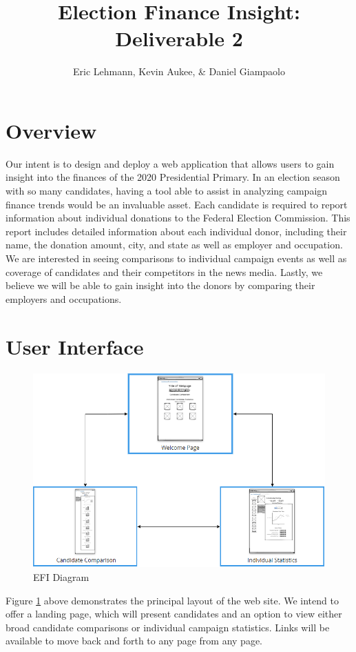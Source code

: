 \documentclass[12pt]{article}
\title{Election Finance Insight:\\Deliverable 2}
\author{Eric Lehmann, Kevin Aukee, \& Daniel Giampaolo}
\begin{document}
\maketitle
\section{Overview}
Our intent is to design and deploy a web application that allows users to gain insight into the finances of the 2020 Presidential Primary. In an election season with so many candidates, having a tool able to assist in analyzing campaign finance trends would be an invaluable asset. Each candidate is required to report information about individual donations to the Federal Election Commission. This report includes detailed information about each individual donor, including their name, the donation amount, city, and state as well as employer and occupation. We are interested in seeing comparisons to individual campaign events as well as coverage of candidates and their competitors in the news media. Lastly, we believe we will be able to gain insight into the donors by comparing their employers and occupations.
\section{User Interface}
    \begin{figure}[H]
        \begin{center}
        \includegraphics[scale=.60]{EFINode}
        \caption{EFI Diagram}
        \label{fig:EFINode}
        \end{center}
    \end{figure}
    Figure \ref{fig:EFINode} above demonstrates the principal layout of the web site. We intend to offer a landing page, which will present candidates and an option to view either broad candidate comparisons or individual campaign statistics. Links will be available to move back and forth to any page from any page.
\end{document}
